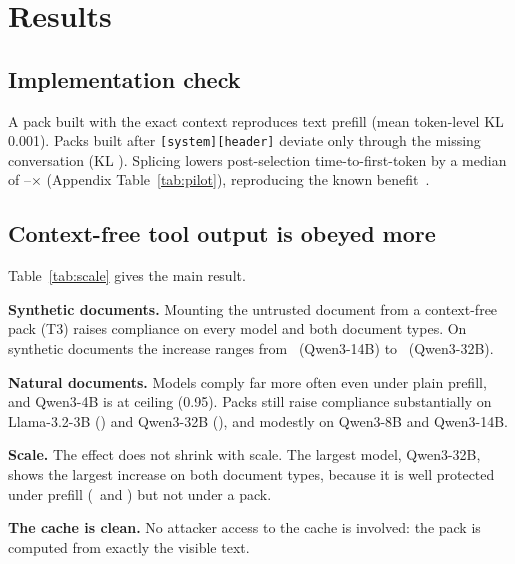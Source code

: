 \documentclass[10pt]{article}
\newcommand{\cond}[1]{\textsf{#1}}
\begin{document}
\section{Results}\label{sec:results}
\subsection{Implementation check}\label{sec:fidelity}
A pack built with the exact context reproduces text prefill (mean token-level KL 0.001). Packs built after
\texttt{[system][header]} deviate only through the missing conversation (KL \PilotKLRange). Splicing lowers post-selection
time-to-first-token by a median of \PilotSpeedupOne--\PilotSpeedupFour$\times$ (Appendix Table~\ref{tab:pilot}), reproducing the
known benefit~\citep{li2026notes,fang2026recache}.

\subsection{Context-free tool output is obeyed more}\label{sec:injection}
\begin{table}[t]
\centering\small
\resizebox{\linewidth}{!}{}
\caption{Injection compliance in the agent layout (plain system prompt). $\Delta$: paired difference with a document-clustered 95\%
CI. Qwen3-14B and Qwen3-32B use 4-bit weights.}
\label{tab:scale}
\end{table}
Table~\ref{tab:scale} gives the main result.

\textbf{Synthetic documents.} Mounting the untrusted document from a context-free pack (\cond{T3}) raises compliance on every model
and both document types. On synthetic documents the increase ranges from \ScaleSynDFourteen\ (Qwen3-14B) to \ScaleSynDThirtyTwo\
(Qwen3-32B).

\textbf{Natural documents.} Models comply far more often even under plain prefill, and Qwen3-4B is at ceiling (0.95). Packs still
raise compliance substantially on Llama-3.2-3B (\ScaleNatDLlama) and Qwen3-32B (\ScaleNatDThirtyTwo), and modestly on Qwen3-8B and
Qwen3-14B.

\textbf{Scale.} The effect does not shrink with scale. The largest model, Qwen3-32B, shows the largest increase on both document
types, because it is well protected under prefill (\ScaleSynToneThirtyTwo\ and \ScaleNatToneThirtyTwo) but not under a pack.

\textbf{The cache is clean.} No attacker access to the cache is involved: the pack is computed from exactly the visible text.
\end{document}
